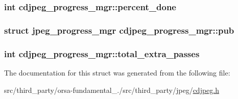 \subsubsection[{percent\+\_\+done}]{\setlength{\rightskip}{0pt plus 5cm}int cdjpeg\+\_\+progress\+\_\+mgr\+::percent\+\_\+done}\label{structcdjpeg__progress__mgr_a73fad2ed10876758edc5523d1cb10f8f}
\hypertarget{structcdjpeg__progress__mgr_a6303d12ac00b08da19794945793f983f}{}
\subsubsection[{pub}]{\setlength{\rightskip}{0pt plus 5cm}struct {\bf jpeg\+\_\+progress\+\_\+mgr} cdjpeg\+\_\+progress\+\_\+mgr\+::pub}\label{structcdjpeg__progress__mgr_a6303d12ac00b08da19794945793f983f}
\hypertarget{structcdjpeg__progress__mgr_a05c1a823d40d937b105e3ba2c13bc00d}{}
\subsubsection[{total\+\_\+extra\+\_\+passes}]{\setlength{\rightskip}{0pt plus 5cm}int cdjpeg\+\_\+progress\+\_\+mgr\+::total\+\_\+extra\+\_\+passes}\label{structcdjpeg__progress__mgr_a05c1a823d40d937b105e3ba2c13bc00d}


The documentation for this struct was generated from the following file\+:\begin{DoxyCompactItemize}
\item 
src/third\+\_\+party/orsa-\/fundamental\+\_./src/third\+\_\+party/jpeg/\hyperlink{cdjpeg_8h}{cdjpeg.\+h}\end{DoxyCompactItemize}
